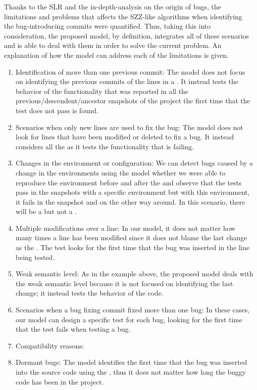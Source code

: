\documentclass[a4paper, 12pt]{book}
\begin{document}
Thanks to the SLR and the in-depth-analysis on the origin of bugs, the limitations and problems that affects the SZZ-like algorithms when identifying the bug-introducing commits were quantified. Thus, taking this into consideration, the proposed model, by definition, integrates all of these scenarios and is able to deal with them in order to solve the current problem. An explanation of how the model can address each of the limitations is given.
 	\begin{enumerate}   
		\item Identification of more than one previous commit: The model does not focus on identifying the previous commits of the lines in a \BFC. It instead tests the behavior of the functionality that was reported in all the previous/descendent/ancestor snapshots of the project the first time that the test does not pass is found.
		\item Scenarios when only new lines are used to fix the bug: The model does not look for lines that have been modified or deleted to fix a bug. It instead considers all the \BFC as it tests the functionality that is failing.
		\item Changes in the environment or configuration: We can detect bugs caused by a change in the environments using the model whether we were able to reproduce the environment before and after the \BFC and observe that the tests pass in the snapshots with a specific environment but with this environment, it fails in the \BFC snapshot and on the other way around. In this scenario, there will be a \FFC but not a \BIC.
		\item Multiple modifications over a line: In our model, it does not matter how many times a line has been modified since it does not blame the last change as the \BIC. The test looks for the first time that the bug was inserted in the line being tested.
		\item Weak semantic level: As in the example above, the proposed model deals with the weak semantic level because it is not focused on identifying the last change; it instead tests the behavior of the code.
		\item Scenarios when a bug fixing commit fixed more than one bug: In these cases, our model can design a specific test for each bug, looking for the first time that the test fails when testing a bug.
		\item Compatibility reasons: 
		\item Dormant bugs: The model identifies the first time that the bug was inserted into the source code using the \TSB, thus it does not matter how long the buggy code has been in the project.
	\end{enumerate}
	
\end{document}
